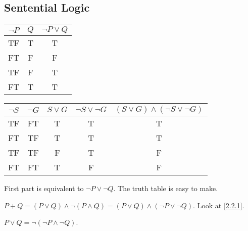\subsection{Sentential Logic}
\begin{exx} \label{2.2.1}
  \begin{tabular}{c c c}
    $\lnot P$ & $Q$ & $\lnot P \lor Q$ \\
    \hline
    TF & T & T \\
    FT & F & F\\
    TF & F & T\\
    FT & T & T
  \end{tabular}
  \begin{tabular}{c c c c c}
    $\lnot S$ & $\lnot G$ & $S\lor G$ & $\lnot S\lor \lnot G$ & $(S\lor G)\land(\lnot S\lor \lnot G)$ \\
    \hline
    TF & FT & T & T & T \\
    FT & TF & T & T & T \\
    TF & TF & F & T & F \\
    FT & FT & T & F & F
  \end{tabular}
\end{exx}

\begin{exx}
  First part is equivalent to $\lnot P\lor \lnot Q$. The truth table is easy to make.
\end{exx}

\begin{exx}
    $P+Q = (P\lor Q)\land\lnot(P\land Q) = (P\lor Q)\land(\lnot P\lor \lnot Q)$.
    Look at \autoref{2.2.1}.
\end{exx}

\begin{exx}
  $P\lor Q=\lnot(\lnot P\land \lnot Q)$.
\end{exx}
